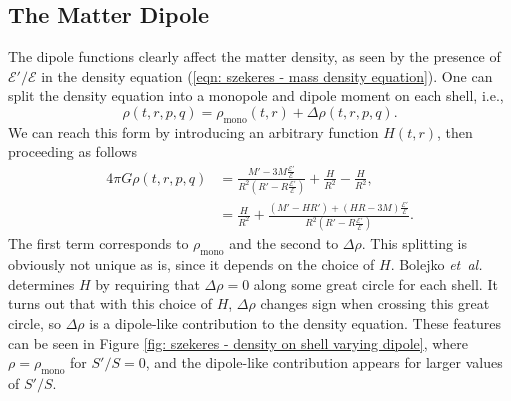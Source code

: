 \documentclass[a4paper,12pt]{report}
\newcommand{\etal}{\emph{et~al.\ }}
\begin{document}
\subsection{The Matter Dipole}
The dipole functions clearly affect the matter density, as seen by the presence of $\mathcal{E}'/\mathcal{E}$ in the density equation (\ref{eqn: szekeres - mass density equation}). One can split the density equation into a monopole and dipole moment on each shell, i.e.,
\begin{equation}
  \rho(t,r,p,q) = \rho_{\text{mono}}(t,r) + \Delta\rho(t,r,p,q).
\end{equation}
We can reach this form by introducing an arbitrary function $H(t,r)$, then proceeding as follows
\begin{subequations}
  \begin{align}
    4\pi G \rho(t,r,p,q) &= \frac{M'-3M\frac{\mathcal{E}'}{\mathcal{E}}}{R^2\left(R'-R\frac{\mathcal{E}'}{\mathcal{E}}\right)} + \frac{H}{R^2} - \frac{H}{R^2}, \\
    &= \frac{H}{R^2} + \frac{(M'-HR')+(HR-3M)\frac{\mathcal{E}'}{\mathcal{E}}}{R^2\left(R'-R\frac{\mathcal{E}'}{\mathcal{E}}\right)}.
  \end{align}
\end{subequations}
The first term corresponds to $\rho_{\text{mono}}$ and the second to $\Delta\rho$. This splitting is obviously not unique as is, since it depends on the choice of $H$. Bolejko \etal \cite{RN4} determines $H$ by requiring that $\Delta\rho=0$ along some great circle for each shell. It turns out that with this choice of $H$, $\Delta\rho$ changes sign when crossing this great circle, so $\Delta \rho$ is a dipole-like contribution to the density equation.
These features can be seen in Figure \ref{fig: szekeres - density on shell varying dipole}, where $\rho=\rho_\text{mono}$ for $S'/S=0$, and the dipole-like contribution appears for larger values of $S'/S$.
\end{document}
